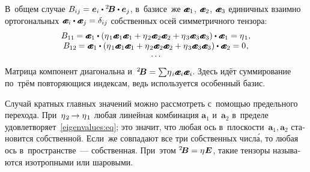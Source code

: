 \begin{otherlanguage}{russian}
\vspace{-0.25em} В~общем случае ${B_{ij} = \bm{e}_i \dotp {^2\!\bm{B}} \dotp \bm{e}_j}$, в~базисе~же ${\mathboldae_1}$, ${\mathboldae_2}$, ${\mathboldae_3}$ единичных взаимно ортогональных ${\mathboldae_i \dotp \mathboldae_j = \delta_{ij}}$ собственных осей симметричного тензора:
\[\begin{array}{c}
B_{11} \hspace{-0.12ex} = \mathboldae_1 \dotp \left({\eigenvalue_1 \mathboldae_1 \mathboldae_1 + \eigenvalue_2 \mathboldae_2 \mathboldae_2 + \eigenvalue_3 \mathboldae_3 \mathboldae_3}\right) \dotp \mathboldae_1 = \eigenvalue_1, \\
B_{12} \hspace{-0.12ex} = \mathboldae_1 \dotp \left({\eigenvalue_1 \mathboldae_1 \mathboldae_1 + \eigenvalue_2 \mathboldae_2 \mathboldae_2 + \eigenvalue_3 \mathboldae_3 \mathboldae_3}\right) \dotp \mathboldae_2 = 0 \hspace{0.1ex}, \\[-0.2em]
\ldots
\end{array}\]
\noindent Матрица компонент диагональна и~${{^2\!\bm{B}} = \sum\! \eigenvalue_i \mathboldae_i \mathboldae_i}$. Здесь идёт суммирование по~трём повторяющися индексам, %
ведь используется особенный базис.

Случай кратных главных значений можно рассмотреть с~помощью предельного перехода. При~${\eigenvalue_2 \hspace{-0.16ex} \to \eigenvalue_1}$ любая линейная комбинация ${\bm{a}_1}$ и~${\bm{a}_2}$ в~пределе удовлетворяет~\eqref{eigenvalues:eq}; это значит, что любая ось в~плоскости~${\bm{a}_1, \bm{a}_2}$ становится собственной. Если~же совпадают все три собственных числ\'{а}, то любая ось в~пространстве~--- собственная. При~этом ${{^2\!\bm{B}} = \eigenvalue \bm{E}}$, такие тензоры называются изотропными или шаровыми.

\end{otherlanguage}



\label{para:rotationtensor}

